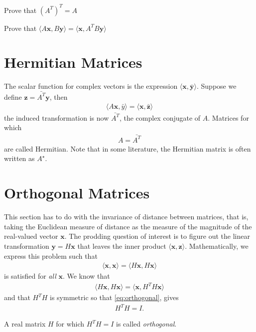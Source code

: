 \begin{homework}
	Prove that $(A^T)^T = A$
\end{homework}
%
\begin{homework}
	Prove that $\langle A\bm{x}, B\bm{y}\rangle = \langle \bm{x}, A^T B \bm{y} \rangle$
\end{homework}

\section{Hermitian Matrices}

The scalar function for complex vectors is the expression $\langle \bm{x}, \bm{\bar{y}}\rangle$. Suppose we define $\bm{z}=\bar{A^T} \bm{y}$, then 
%
\begin{align}
\langle A \bm{x}, \bar{y}\rangle =\langle \bm{x}, \bar{\bm{z}}\rangle 
\end{align}
%
\ie the induced transformation is now $\bar{A^T}$, the complex conjugate of $A$. Matrices for which 
%
\begin{align}
	A = \bar{A^T}
\end{align}
%
are called Hermitian. Note that in some literature, the Hermitian matrix is often written as $A^\star$.

\section{Orthogonal Matrices}
%
This section has to do with the invariance of distance between matrices, that is, taking the Euclidean measure of distance as the measure of the magnitude of the real-valued vector $\bm{x}$. The prodding question of interest is to figure out the linear transformation $\bm{y} = H \bm{x}$ that leaves the inner product $\langle\bm{x}, \bm{z}\rangle$. Mathematically, we express this problem such that 
%
\begin{align}
	\langle \bm{x}, \bm{x}\rangle = \langle H\bm{x}, H \bm{x} \rangle 
	\label{eq:orthogonal}
\end{align}
%
is satisfied for \textit{all} $\bm{x}$. We know that  
%
\begin{align}
	\langle H \bm{x}, H \bm{x}\rangle = \langle \bm{x}, H^T H \bm{x}\rangle
\end{align}
%
and that $H^TH$ is symmetric so that  \eqref{eq:orthogonal}, gives 
%
\begin{align}
	H^TH = I.
	\label{eq:real_invar}
\end{align}
%
\begin{tcolorbox}[title=Orthogonal Matrix]
	A real matrix $H$ for which $H^TH=I$ is called \textit{orthogonal}.
\end{tcolorbox}


